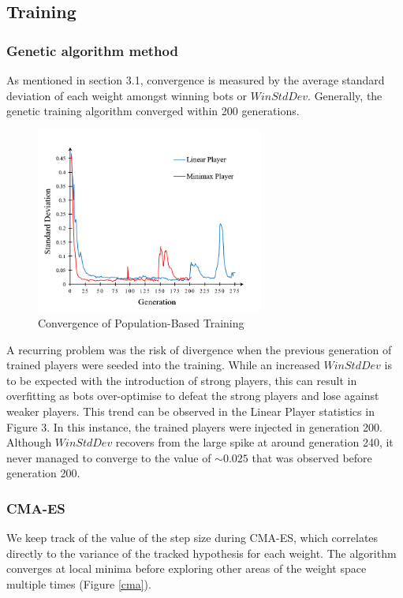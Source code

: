 \documentclass{article}
\begin{document}
\subsection{Training}
\subsubsection{Genetic algorithm method}
As mentioned in section 3.1, convergence is measured by the average standard deviation of each weight amongst winning bots or $WinStdDev$. Generally, the genetic training algorithm converged within 200 generations.

\begin{figure}[h!]
\centering
\includegraphics[width=7.5cm]{TrainingResultsConvergence2.png}
\caption{Convergence of Population-Based Training}
\label{convergence}
\end{figure}

A recurring problem was the risk of divergence when the previous generation of trained players were seeded into the training. While an increased $WinStdDev$ is to be expected with the introduction of strong players, this can result in overfitting as bots over-optimise to defeat the strong players and lose against weaker players. This trend can be observed in the Linear Player statistics in Figure 3. In this instance, the trained players were injected in generation 200. Although $WinStdDev$ recovers from the large spike at around generation 240, it never managed to converge to the value of \({\sim}0.025\) that was observed before generation 200.

\subsubsection{CMA-ES}
We keep track of the value of the step size during CMA-ES, which correlates directly to the variance of the tracked hypothesis for each weight. The algorithm converges at local minima before exploring other areas of the weight space multiple times (Figure \ref{cma}).
\end{document}
